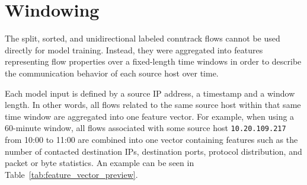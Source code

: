 \section{Windowing}
The split, sorted, and unidirectional labeled conntrack flows cannot be used directly for model training. Instead, they were aggregated into features representing flow properties over a fixed-length time windows in order to describe the communication behavior of each source host over time. 


Each model input is defined by a source IP address, a timestamp and a window length. In other words, all flows related to the same source host within that same time window are aggregated into one feature vector. For example, when using a 60-minute window, all flows associated with some source host \texttt{10.20.109.217} from 10:00 to 11:00 are combined into one vector containing features such as the number of contacted destination IPs, destination ports, protocol distribution, and packet or byte statistics. An example can be seen in Table~\ref{tab:feature_vector_preview}.

\begin{table}[htbp]
\centering
\caption{Example feature vectors after window-based aggregation.}
\label{tab:feature_vector_preview}
\small
{}
\end{table}



